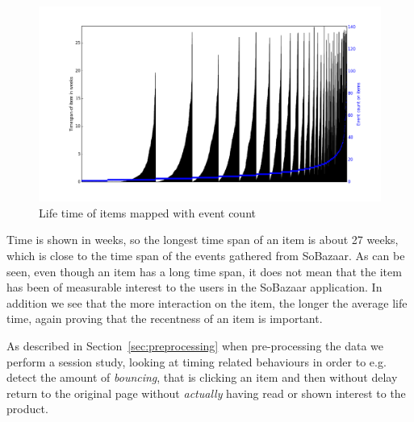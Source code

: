 \begin{figure}[H]
  \centering
  \includegraphics[width=5in]{image/itemTimeSpansortedoneventcount.png}
  \caption{Life time of items mapped with event count}
  \label{figure:itemTimeSpanEventCount}
\end{figure}

Time is shown in weeks, so the longest time span of an item is about 27 weeks,
which is close to the time span of the events gathered from SoBazaar. As can be
seen, even though an item has a long time span, it does not mean that the item
has been of measurable interest to the users in the SoBazaar application. In
addition we see that the more interaction on the item, the longer the average
life time, again proving that the recentness of an item is important.

As described in Section~\ref{sec:preprocessing} when pre-processing the data we
perform a session study, looking at timing related behaviours in order to e.g.
detect the amount of \textit{bouncing}, that is clicking an item and then
without delay return to the original page without \textit{actually} having read
or shown interest to the product.

